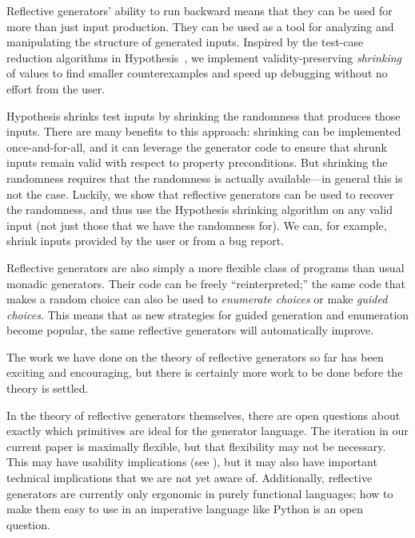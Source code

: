 Reflective generators' ability to run backward means that they can be used for
more than just input production. They can be used as a tool for analyzing and
manipulating the structure of generated inputs. Inspired by the test-case
reduction algorithms in Hypothesis~\cite{maciver_test-case_2020}, we implement
validity-preserving {\em shrinking} of values to find smaller counterexamples
and speed up debugging without no effort from the user.

Hypothesis shrinks test inputs by shrinking the randomness that produces those
inputs. There are many benefits to this approach: shrinking can be implemented
once-and-for-all, and it can leverage the generator code to ensure that shrunk
inputs remain valid with respect to property preconditions. But shrinking the
randomness requires that the randomness is actually available---in general this
is not the case. Luckily, we show that reflective generators can be used to
recover the randomness, and thus use the Hypothesis shrinking algorithm on any
valid input (not just those that we have the randomness for). We can, for
example, shrink inputs provided by the user or from a bug report.

 Reflective generators are also simply a
more flexible class of programs than usual monadic generators. Their code can be
freely ``reinterpreted;'' the same code that makes a random choice can also be
used to {\em enumerate choices} or make {\em guided choices}. This means that as
new strategies for guided generation and enumeration become popular, the same
reflective generators will automatically improve.

\medskip

The work we have done on the theory of reflective generators so far has been
exciting and encouraging, but there is certainly more work to be done before the
theory is settled.

In the theory of reflective generators themselves, there are open questions
about exactly which primitives are ideal for the generator language. The
iteration in our current paper is maximally flexible, but that flexibility may
not be necessary. This may have usability implications (see
), but it may also have important technical
implications that we are not yet aware of. Additionally, reflective generators
are currently only ergonomic in purely functional languages; how to make them
easy to use in an imperative language like Python is an open question.

